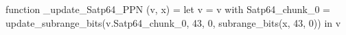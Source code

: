 function _update_Satp64_PPN (v, x) = let v = { v with Satp64_chunk_0 = update_subrange_bits(v.Satp64_chunk_0, 43, 0, subrange_bits(x, 43, 0)) } in
  v
